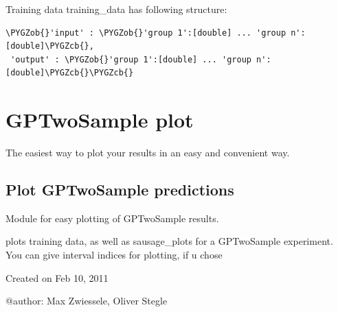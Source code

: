 \documentclass[letterpaper,10pt,english]{sphinxmanual}
\def\PYGZob{\char`\{}
\def\PYGZcb{\char`\}}
\begin{document}
\begin{fulllineitems}
\begin{fulllineitems}
\begin{description}
Training data training\_data has following structure:

\begin{Verbatim}[commandchars=\\\{\}]
\PYGZob{}'input' : \PYGZob{}'group 1':[double] ... 'group n':[double]\PYGZcb{},
 'output' : \PYGZob{}'group 1':[double] ... 'group n':[double]\PYGZcb{}\PYGZcb{}
\end{Verbatim}

\end{description}

\end{fulllineitems}


\end{fulllineitems}

\label{plot:module-gptwosample.plot}

\section{GPTwoSample plot}
\label{plot::doc}\label{plot:gptwosample-plot}
The easiest way to plot your results in an easy and convenient way.
\label{plot:module-gptwosample.plot.plot_basic}

\subsection{Plot GPTwoSample predictions}
\label{plot:plot-gptwosample-predictions}
Module for easy plotting of GPTwoSample results.

{\hyperref[plot:gptwosample.plot.plot_basic.plot_results]{}} plots
training data, as well as sausage\_plots for a GPTwoSample
experiment. You can give interval indices for plotting, if u chose

Created on Feb 10, 2011

@author: Max Zwiessele, Oliver Stegle
\end{document}
